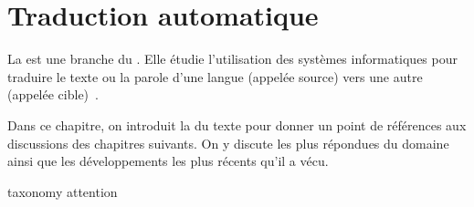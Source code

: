 \chapter{Traduction automatique}


La  est une branche du .
Elle étudie l'utilisation des systèmes informatiques pour traduire le texte ou la parole d'une langue (appelée source) vers une autre (appelée cible)~\cite{routledge}.

Dans ce chapitre, on introduit la  du texte pour donner un point de références aux discussions des chapitres suivants.
On y discute les plus répondues du domaine 
ainsi que les développements les plus récents qu'il a vécu.

{taxonomy}
{attention}